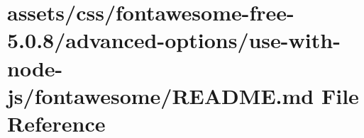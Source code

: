 \hypertarget{css_2fontawesome-free-5_80_88_2advanced-options_2use-with-node-js_2fontawesome_2_r_e_a_d_m_e_8md}{}\section{assets/css/fontawesome-\/free-\/5.0.8/advanced-\/options/use-\/with-\/node-\/js/fontawesome/\+R\+E\+A\+D\+ME.md File Reference}
\label{css_2fontawesome-free-5_80_88_2advanced-options_2use-with-node-js_2fontawesome_2_r_e_a_d_m_e_8md}
